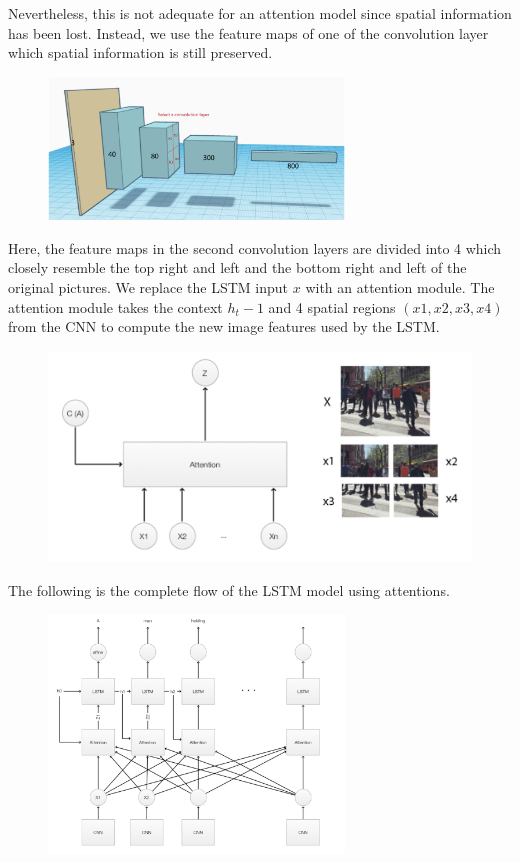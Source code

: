 \documentclass[a4paper]{article}
\begin{document}
\noindent Nevertheless, this is not adequate for an attention model since spatial information has been lost. Instead, we use the feature maps of one of the convolution layer which spatial information is still preserved.

\begin{figure}[H]
\centering
\includegraphics[width=0.7\textwidth]{5.png}
\end{figure}
\noindent Here, the feature maps in the second convolution layers are divided into 4 which closely resemble the top right and left and the bottom right and left of the original pictures. We replace the LSTM input $x$ with an attention module. The attention module takes the context $h_t−1$ and 4 spatial regions $(x1,x2,x3,x4)$ from the CNN to compute the new image features used by the LSTM.
\begin{figure}[H]
\centering
\includegraphics[width=1\textwidth]{6.png}
\end{figure}
The following is the complete flow of the LSTM model using attentions.
\begin{figure}[H]
\centering
\includegraphics[width=0.7\textwidth]{7.png}
\end{figure}
\end{document}
